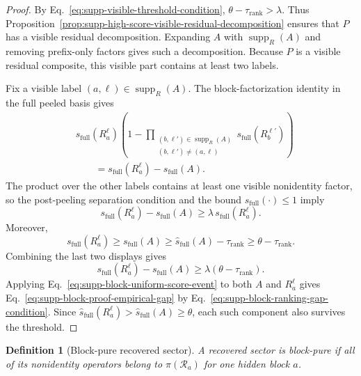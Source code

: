 \documentclass[
  aps,
  prx,
  reprint,
  superscriptaddress,
  amsmath,
  amssymb,
  nofootinbib,
  longbibliography
]{revtex4-2}
\newtheorem{definition}[theorem]{Definition}
\newcommand{\supp}{\operatorname{supp}}
\begin{document}
\begin{proof}
By Eq.~\eqref{eq:supp-visible-threshold-condition},
$\theta-\tau_{\mathrm{rank}}>\lambda$.  Thus
Proposition~\ref{prop:supp-high-score-visible-residual-decomposition} ensures
that $P$ has a visible residual decomposition.  Expanding $A$ with
$\supp_R(A)$ and removing prefix-only factors gives such a decomposition.
Because $P$ is a visible residual composite, this visible part contains at
least two labels.

Fix a visible label $(a,\ell)\in\supp_R(A)$.  The block-factorization identity
in the full peeled basis gives
\begin{equation}
\begin{aligned}
&s_{\mathrm{full}}(R_a^\ell)
\left(1-
\prod_{\substack{(b,\ell')\in\supp_R(A)\\(b,\ell')\ne(a,\ell)}}
s_{\mathrm{full}}(R_b^{\ell'})
\right)
\\
&\qquad =
s_{\mathrm{full}}(R_a^\ell)-s_{\mathrm{full}}(A).
\end{aligned}
\end{equation}
The product over the other labels contains at least one visible nonidentity
factor, so the post-peeling separation condition and the bound
$s_{\mathrm{full}}(\cdot)\le1$ imply
\begin{equation}
s_{\mathrm{full}}(R_a^\ell)-s_{\mathrm{full}}(A)
\ge
\lambda\,s_{\mathrm{full}}(R_a^\ell).
\end{equation}
Moreover,
\begin{equation}
s_{\mathrm{full}}(R_a^\ell)
\ge
s_{\mathrm{full}}(A)
\ge
\hat s_{\mathrm{full}}(A)-\tau_{\mathrm{rank}}
\ge
\theta-\tau_{\mathrm{rank}} .
\end{equation}
Combining the last two displays gives
\begin{equation}
s_{\mathrm{full}}(R_a^\ell)-s_{\mathrm{full}}(A)
\ge
\lambda(\theta-\tau_{\mathrm{rank}}).
\label{eq:supp-block-proof-gap}
\end{equation}
Applying Eq.~\eqref{eq:supp-block-uniform-score-event} to both $A$ and
$R_a^\ell$ gives Eq.~\eqref{eq:supp-block-proof-empirical-gap} by
Eq.~\eqref{eq:supp-block-ranking-gap-condition}.  Since
$\hat s_{\mathrm{full}}(R_a^\ell)>\hat s_{\mathrm{full}}(A)\ge\theta$,
each such component also survives the threshold.
\end{proof}

\begin{definition}[Block-pure recovered sector]
A recovered sector is \emph{block-pure} if all of its nonidentity operators
belong to $\pi(\mathcal R_a)$ for one hidden block $a$.
\end{definition}
\end{document}

